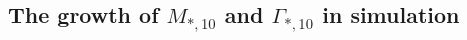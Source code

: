 \documentclass[fleqn,usenatbib]{mnras}
\begin{document}
\subsection{The growth of $M_{*,10}$ and $\Gamma_{*,10}$ in simulation}
\end{document}
